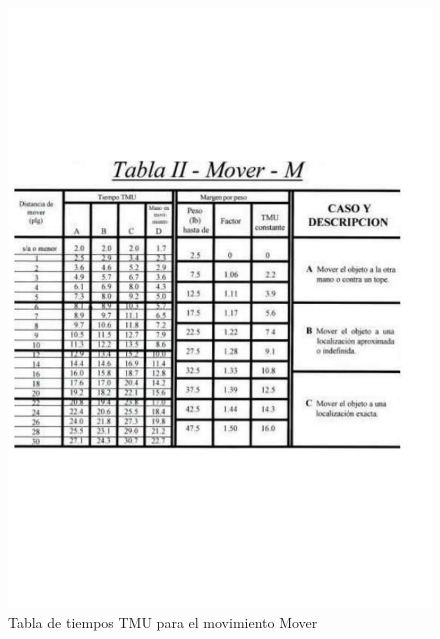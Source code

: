    \begin{figure}[H]
        \centering
        \includegraphics[trim = {20mm 40mm 20mm 25mm},clip,scale=0.25]{9/Img/tablaMover.pdf}
        \caption{Tabla de tiempos TMU para el movimiento Mover}
        \label{fig:bimanual}
    \end{figure}
